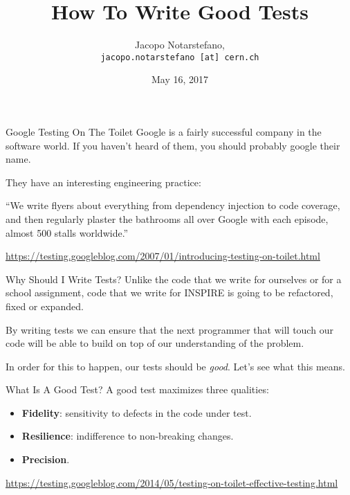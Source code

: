 \documentclass[10pt]{beamer}
\title{How To Write Good Tests}
\author{
  Jacopo Notarstefano,\\
  \texttt{jacopo.notarstefano [at] cern.ch}
}
\date{May 16, 2017}
\begin{document}
  \begin{frame}[plain]
    \titlepage{}
  \end{frame}

  \begin{frame}{Google Testing On The Toilet}
    Google is a fairly successful company in the software world. If you haven't
    heard of them, you should probably google their name.

    \vspace{0.25cm}

    They have an interesting engineering practice:

    \vspace{0.25cm}

    \begin{block}{}
      ``We write flyers about everything from dependency injection to code
      coverage, and then regularly plaster the bathrooms all over Google with
      each episode, almost 500 stalls worldwide.''
    \end{block}

    \vspace{0.5cm}

    \url{https://testing.googleblog.com/2007/01/introducing-testing-on-toilet.html}
  \end{frame}

  \begin{frame}{Why Should I Write Tests?}
    Unlike the code that we write for ourselves or for a school assignment, code
    that we write for INSPIRE is going to be refactored, fixed or expanded.

    \vspace{0.5cm}

    By writing tests we can ensure that the next programmer that will touch our
    code will be able to build on top of our understanding of the problem.

    \vspace{0.5cm}

    In order for this to happen, our tests should be \emph{good}. Let's see
    what this means.
  \end{frame}

  \begin{frame}{What Is A Good Test?}
    A good test maximizes three qualities:

    \vspace{0.25cm}

    \begin{itemize}
      \item \textbf{Fidelity}: sensitivity to defects in the code under test.
      \item \textbf{Resilience}: indifference to non-breaking changes.
      \item \textbf{Precision}.
    \end{itemize}

    \vspace{0.5cm}

    \url{https://testing.googleblog.com/2014/05/testing-on-toilet-effective-testing.html}
  \end{frame}
\end{document}

